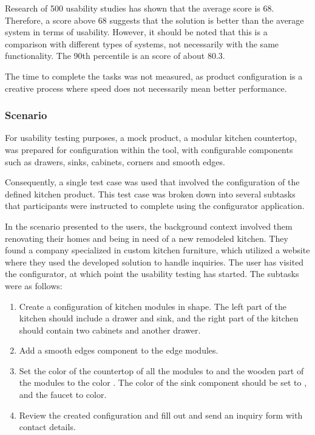 Research of 500 usability studies has shown that the average  score is 68. Therefore, a score above 68 suggests that the solution is better than the average system in terms of usability. However, it should be noted that this is a comparison with different types of systems, not necessarily with the same functionality. The 90th percentile is an  score of about 80.3. \cite{Sauro2011}

The time to complete the tasks was not measured, as product configuration is a creative process where speed does not necessarily mean better performance. 

\subsubsection{Scenario}

For usability testing purposes, a mock product, a modular kitchen countertop, was prepared for configuration within the tool, with configurable components such as drawers, sinks, cabinets, corners and smooth edges.

Consequently, a single test case was used that involved the configuration of the defined kitchen product. This test case was broken down into several subtasks that participants were instructed to complete using the configurator application.

In the scenario presented to the users, the background context involved them renovating their homes and being in need of a new remodeled kitchen. They found a company specialized in custom kitchen furniture, which utilized a website where they used the developed solution to handle inquiries. The user has visited the configurator, at which point the usability testing has started. The subtasks were as follows:
\begin{enumerate}
    \item Create a configuration of kitchen modules in  shape. The left part of the kitchen should include a drawer and sink, and the right part of the kitchen should contain two cabinets and another drawer.
    \item Add a smooth edges component to the edge modules.
    \item Set the color of the countertop of all the modules to  and the wooden part of the modules to the color . The color of the sink component should be set to , and the faucet to  color.
    \item Review the created configuration and fill out and send an inquiry form with contact details.
\end{enumerate}

